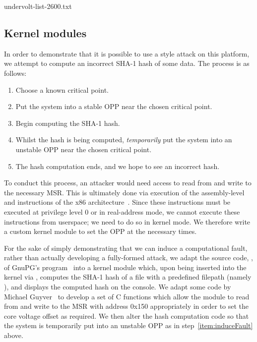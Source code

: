 
    {undervolt-list-2600.txt}    

\subsection{Kernel modules}
\label{sec:modules}

In order to demonstrate that it is possible to use a \clkscrew{} style attack
on this platform, we attempt to compute an incorrect SHA-1 hash of some data.
The process is as follows:

\begin{enumerate}
    \item Choose a known critical point.
    \item Put the system into a stable OPP near the chosen critical point.
    \item Begin computing the SHA-1 hash.
    \item \label{item:induceFault} Whilst the hash is being computed,
        \emph{temporarily} put the system into an unstable OPP near the chosen
        critical point.
    \item The hash computation ends, and we hope to see an incorrect hash.
\end{enumerate}

To conduct this process, an attacker would need access to read from and write to
the necessary MSR. This is ultimately done via execution of the assembly-level
 and  instructions of the x86
architecture~\cite[Vol. 2, §§4.3–4]{intelDevManual}. Since these instructions
must be executed at privilege level 0 or in real-address mode, we cannot
execute these instructions from userspace; we need to do so in kernel mode. We
therefore write a custom kernel module to set the OPP at the necessary times.

For the sake of simply demonstrating that we can induce a computational fault,
rather than actually developing a fully-formed attack, we adapt the source code,
, of GnuPG's  program~\cite{gnupgSHA} into a
kernel module which, upon being inserted into the kernel via ,
computes the SHA-1 hash of a file with a predefined filepath (namely
), and displays the computed hash on the console.
We adapt some code by Michael Guyver~\cite{guyverCode} to develop a set of C
functions which allow the module to read from and write to the MSR with address
0x150 appropriately in order to set the core voltage offset as required. We then
alter the hash computation code so that the system is temporarily put into an
unstable OPP as in step~\ref{item:induceFault} above.

